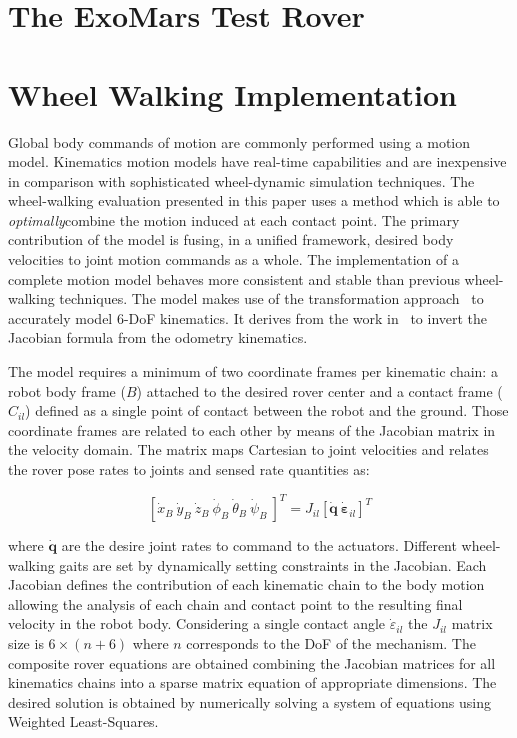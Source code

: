 \documentclass[a4paper,twocolumn]{esapub2005} %
\begin{document}
\section{The ExoMars Test Rover}


\section{Wheel Walking Implementation}

Global body commands of motion are commonly performed using a motion model.
Kinematics motion models have real-time capabilities and are inexpensive in
comparison with sophisticated wheel-dynamic simulation techniques.  The
wheel-walking evaluation presented in this paper uses a method which is able to
\textit{optimally}\footnotemark[2] combine the motion induced at each contact
point. The primary contribution of the model is fusing, in a unified framework,
desired body velocities to joint motion commands as a whole.  The
implementation of a complete motion model behaves more consistent and stable
than previous wheel-walking techniques. The model makes use of the
transformation approach~\cite{Tarokh2005} to accurately model 6-DoF kinematics.
It derives from the work in~\cite{Hidalgo-Carrio2014} to invert the Jacobian
formula from the odometry kinematics.

The model requires a minimum of two coordinate frames per kinematic chain:
a robot body frame ($B$) attached to the desired rover center and a
contact frame ($C_{il}$) defined as a single point of contact between the robot
and the ground. Those coordinate frames are related to each other by means of
the Jacobian matrix in the velocity domain. The matrix maps Cartesian to joint velocities and
relates the rover pose rates to joints and sensed rate quantities as:

\begin{equation}
    \left[\dot{x}_{B} ~ \dot{y}_{B} ~ \dot{z}_{B} ~ \dot{\phi}_{B} ~ \dot{\theta}_{B} ~ \dot{\psi}_{B} ~ \right]^T =
    J_{il} \left[\boldsymbol{\dot{q}} ~ \boldsymbol{\dot{\varepsilon}}_{il} \right]^T
\label{eq:wheeljacobian}
\end{equation}

where $\boldsymbol{\dot{q}}$ are the desire joint rates to command to the
actuators.  Different wheel-walking gaits are set by dynamically setting
constraints in the Jacobian. Each Jacobian defines the contribution of each
kinematic chain to the body motion allowing the analysis of each chain and
contact point to the resulting final velocity in the robot body.  Considering a
single contact angle $\dot{\varepsilon}_{il}$ the $J_{il}$ matrix size is $6
\times (n + 6)$ where $n$ corresponds to the DoF of the mechanism.  The
composite rover equations are obtained combining the Jacobian matrices for all
kinematics chains into a sparse matrix equation of appropriate dimensions. The
desired solution is obtained by numerically solving a system of equations using
Weighted Least-Squares.
\end{document}
